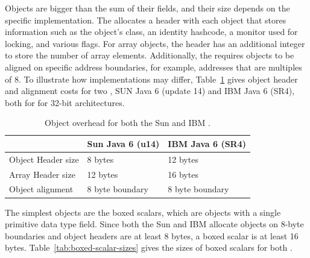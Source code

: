 Objects are bigger than the sum of their fields, and their size depends on the
specific \jre implementation. The \jre allocates a header with each object that
stores information such as the object's class, an identity hashcode, a monitor
used for locking, and various flags. For array objects, the header has an
additional integer to store the number of array elements. Additionally,  the
\jre requires objects to be aligned on specific address boundaries, for
example, addresses that are multiples of 8. To illustrate how implementations
may differ, Table~\ref{tab:object-overhead} gives object header and alignment
costs for two \jres, SUN Java 6 (update 14) and IBM Java 6 (SR4), both for for
32-bit architectures.
\begin{table}
  \centering
 \begin{tabular}{lll} \toprule
 	& Sun Java 6 (u14) & IBM Java 6 (SR4) \\ \midrule
 	Object Header size & 8 bytes & 12 bytes \\
 	Array Header size & 12 bytes & 16 bytes \\
 	Object alignment & 8 byte boundary & 8 byte boundary \\
 	\bottomrule
 \end{tabular}
  \caption{Object overhead for both the Sun and IBM \jres.}
  \label{tab:object-overhead}
\end{table} 
   
The simplest objects are the boxed scalars, which are objects with a single
primitive data type field. Since both the Sun and IBM \jres allocate objects on
8-byte boundaries and object headers are at least 8 bytes, a boxed scalar is at
least 16 bytes. Table~\ref{tab:boxed-scalar-sizes} gives the sizes of boxed
scalars for both \jres.

